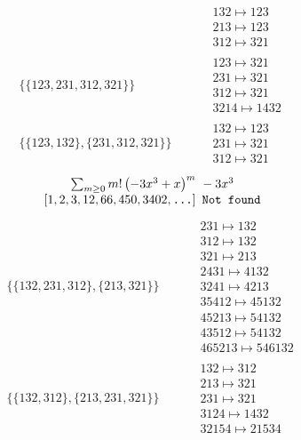 \begin{tiny}
\begin{align}
\quad
&
\phantom{.}
&
\begin{matrix}
132 \mapsto 123\\213 \mapsto 123\\312 \mapsto 321
\end{matrix}
\\
\{\{123, 231, 312, 321\}\}
\quad
&
\phantom{.}
&
\begin{matrix}
123 \mapsto 321\\231 \mapsto 321\\312 \mapsto 321\\3214 \mapsto 1432
\end{matrix}
\\
\{\{123, 132\}, \{231, 312, 321\}\}
\quad
&
\phantom{.}
&
\begin{matrix}
132 \mapsto 123\\231 \mapsto 321\\312 \mapsto 321
\end{matrix}
\end{align}
$$
\begin{matrix}
\sum_{m \geq 0} m! \left(
-3 x^{3} + x
\right)^m
\ 
-3 x^{3}
\\
\left[1, 2, 3, 12, 66, 450, 3402, \text{\texttt{...}}\right]
\ 
\texttt{Not found}
\end{matrix}
$$
\vspace{-1em}
\begin{align}
\{\{132, 231, 312\}, \{213, 321\}\}
\quad
&
\phantom{.}
&
\begin{matrix}
231 \mapsto 132\\312 \mapsto 132\\321 \mapsto 213\\2431 \mapsto 4132\\3241 \mapsto 4213\\35412 \mapsto 45132\\45213 \mapsto 54132\\43512 \mapsto 54132\\465213 \mapsto 546132
\end{matrix}
\\
\{\{132, 312\}, \{213, 231, 321\}\}
\quad
&
\phantom{.}
&
\begin{matrix}
132 \mapsto 312\\213 \mapsto 321\\231 \mapsto 321\\3124 \mapsto 1432\\32154 \mapsto 21534
\end{matrix}
\\

\end{align}
\end{tiny}
